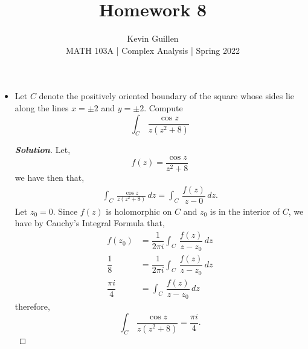 \documentclass[11pt]{article}
\newenvironment{problem}[2][Problem\!]{\begin{trivlist}
\item[\hskip \labelsep {\bfseries #1}\hskip \labelsep {\bfseries #2}]}{\end{trivlist}}
\newenvironment{solution}{\begin{proof}[\textbf{\textit{Solution}}] }{\end{proof}}
\begin{document}
 
\title{Homework 8}
\author{Kevin Guillen\\[0.5em]
MATH 103A | Complex Analysis | Spring 2022}
\date{} 
\maketitle


\begin{problem}{8.1}\hfill
\begin{itemize}[itemsep=3em]
\item[(a)] Let $C$ denote the positively oriented boundary of the square whose sides lie along the lines $x = \pm 2$ and $y = \pm 2$. Compute
\[\int_C\,\frac{\cos z}{z(z^2 + 8)}\]
\begin{solution}
    Let,
    \[f(z) = \dfrac{\cos z}{z^{2}+8}\] 
    we have then that,
    \begin{align*}
        \int_C\,\frac{\cos z}{z(z^2 + 8)}\, d z = \int_C\, \dfrac{f(z)}{z - 0}\, d z .
    \end{align*}
    Let $z_0 = 0$. Since $f(z)$ is holomorphic on $C$ and $z_0$ is in the interior of $C$, we have by Cauchy's Integral Formula that,
    \begin{align*}
        f(z_0) &= \dfrac{1}{2\pi i} \int_C \, \dfrac{f(z)}{z - z_0} \, d z \\
        \dfrac{1}{8} &= \dfrac{1}{2\pi i}\int_C \, \dfrac{f(z)}{z - z_0} \, d z  \\
        \dfrac{\pi i }{4} & = \int_C \, \dfrac{f(z)}{z - z_0} \, d z 
    \end{align*}
    therefore,
    \[\int_C\,\frac{\cos z}{z(z^2 + 8)} = \dfrac{\pi i}{4}.\]
\end{solution}


\end{itemize}
\end{problem}
\end{document}
